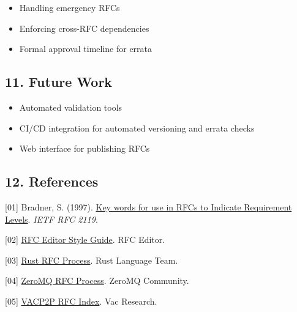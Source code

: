 \begin{itemize}
\tightlist
\item
  Handling emergency RFCs
\item
  Enforcing cross-RFC dependencies
\item
  Formal approval timeline for errata
\end{itemize}

\subsection{11. Future Work}\label{future-work}

\begin{itemize}
\tightlist
\item
  Automated validation tools
\item
  CI/CD integration for automated versioning and errata checks
\item
  Web interface for publishing RFCs
\end{itemize}

\subsection{12. References}\label{references}

{[}01{]} Bradner, S. (1997).
\href{https://datatracker.ietf.org/doc/html/rfc2119}{Key words for use
in RFCs to Indicate Requirement Levels}. \emph{IETF RFC 2119}.

{[}02{]} \href{https://www.rfc-editor.org/styleguide/}{RFC Editor Style
Guide}. RFC Editor.

{[}03{]} \href{https://github.com/rust-lang/rfcs}{Rust RFC Process}.
Rust Language Team.

{[}04{]} \href{https://rfc.zeromq.org}{ZeroMQ RFC Process}. ZeroMQ
Community.

{[}05{]} \href{https://github.com/vacp2p/rfc-index}{VACP2P RFC Index}.
Vac Research.
